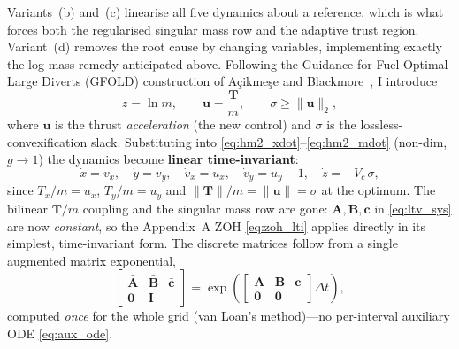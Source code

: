 \documentclass[../main.tex]{subfiles}
\begin{document}
Variants~(b) and~(c) linearise all five dynamics about a reference, which is what forces both the regularised singular mass row and the adaptive trust region. Variant~(d) removes the root cause by changing variables, implementing exactly the log-mass remedy anticipated above. Following the Guidance for Fuel-Optimal Large Diverts (GFOLD) construction of A\c{c}ikme\c{s}e and Blackmore~\cite{acikmese2007,benedikter2022}, I introduce
\begin{equation}
    z = \ln m,\qquad \mathbf{u} = \frac{\mathbf{T}}{m},\qquad \sigma \geq \|\mathbf{u}\|_2,
    \label{eq:gfold_cov}
\end{equation}
where $\mathbf{u}$ is the thrust \emph{acceleration} (the new control) and $\sigma$ is the lossless-convexification slack. Substituting into \eqref{eq:hm2_xdot}--\eqref{eq:hm2_mdot} (non-dim, $g\!\to\!1$) the dynamics become \textbf{linear time-invariant}:
\begin{equation}
    \dot{x} = v_x,\quad \dot{y} = v_y,\quad \dot{v}_x = u_x,\quad \dot{v}_y = u_y - 1,\quad \dot{z} = -V_c\,\sigma,
    \label{eq:gfold_lti}
\end{equation}
since $T_x/m = u_x$, $T_y/m = u_y$ and $\|\mathbf{T}\|/m = \|\mathbf{u}\| = \sigma$ at the optimum. The bilinear $\mathbf{T}/m$ coupling and the singular mass row are gone: $\mathbf{A},\mathbf{B},\mathbf{c}$ in \eqref{eq:ltv_sys} are now \emph{constant}, so the Appendix~A ZOH \eqref{eq:zoh_lti} applies directly in its simplest, time-invariant form. The discrete matrices follow from a single augmented matrix exponential,
\begin{equation}
    \begin{bmatrix}\bar{\mathbf{A}} & \bar{\mathbf{B}} & \bar{\mathbf{c}}\\ \mathbf{0} & \mathbf{I}\end{bmatrix}
    = \exp\!\left(\begin{bmatrix}\mathbf{A} & \mathbf{B} & \mathbf{c}\\ \mathbf{0} & \mathbf{0}\end{bmatrix}\Delta t\right),
    \label{eq:gfold_vanloan}
\end{equation}
computed \emph{once} for the whole grid (van Loan's method)---no per-interval auxiliary ODE \eqref{eq:aux_ode}.
\end{document}
